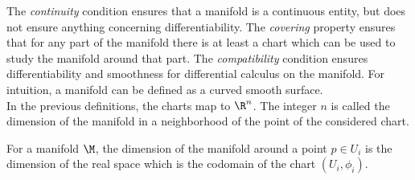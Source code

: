 %
The \textit{continuity} condition ensures that a manifold is a continuous entity, but does not ensure anything concerning differentiability. The \textit{covering} property ensures that for any part of the manifold there is at least a chart which can be used to study the manifold around that part. The \textit{compatibility} condition ensures differentiability and smoothness for differential calculus on the manifold. For intuition, a manifold can be defined as a curved smooth surface.\\
%
In the previous definitions, the charts map to $\R^n$. The integer $n$ is called the dimension of the manifold in a neighborhood of the point of the considered
chart. 
%
\begin{defn}[Dimension]
	For a manifold $\M$, the dimension of the manifold around a point $p\in U_i$ is the dimension of the real space which
	is the codomain of the chart $(U_i, \phi_i)$. 
\end{defn}
%

